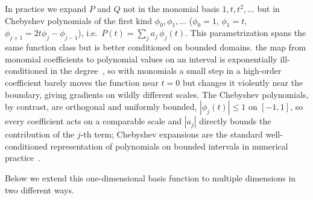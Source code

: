 \documentclass{article} %
\begin{document}
In practice we expand $P$ and $Q$ not in the monomial basis $1,t,t^2,\dots$ but in Chebyshev polynomials of the first kind $\phi_0,\phi_1,\dots$ ($\phi_0{=}1$, $\phi_1{=}t$, $\phi_{j+1}{=}2t\phi_j-\phi_{j-1}$), i.e.\ $P(t)=\sum_j a_j\,\phi_j(t)$.
This parametrization spans the same function class but is better conditioned on bounded domains.
the map from monomial coefficients to polynomial values on an interval is exponentially ill-conditioned in the degree~\citep{gautschi1979condition}, so with monomials a small step in a high-order coefficient barely moves the function near $t=0$ but changes it violently near the boundary, giving gradients on wildly different scales.
The Chebyshev polynomials, by contrast, are orthogonal and uniformly bounded, $|\phi_j(t)|\le 1$ on $[-1,1]$, so every coefficient acts on a comparable scale and $|a_j|$ directly bounds the contribution of the $j$-th term; Chebyshev expansions are the standard well-conditioned representation of polynomials on bounded intervals in numerical practice~\citep{trefethen2019approximation}.

Below we extend this one-dimensional basis function to multiple dimensions in two different ways.
\end{document}
